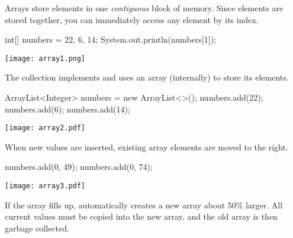 
Arrays store elements in one \emph{contiguous} block of memory.
Since elements are stored together, you can immediately access any element by its index.

\vspace{1ex}
\begin{minipage}{0.50\linewidth}
\begin{javalst}
    int[] numbers = {22, 6, 14};
    System.out.println(numbers[1]);
\end{javalst}
\end{minipage}
\hfill
\begin{minipage}{0.48\linewidth}
\centering
\texttt{[image: array1.png]}
\end{minipage}
\vspace{1ex}

The  collection implements  and uses an array (internally) to store its elements.

\vspace{1ex}
\begin{minipage}{0.35\linewidth}
\begin{javalst}
    ArrayList<Integer> numbers = new ArrayList<>();
    numbers.add(22);
    numbers.add(6);
    numbers.add(14);
\end{javalst}
\end{minipage}
\hfill
\begin{minipage}{0.63\linewidth}
\vspace*{2em}
\texttt{[image: array2.pdf]}
\end{minipage}
\vspace{1ex}

When new values are inserted, existing array elements are moved to the right.

\vspace{1ex}
\begin{minipage}{0.35\linewidth}
\begin{javalst}
    numbers.add(0, 49);
    numbers.add(0, 74);
\end{javalst}
\end{minipage}
\hfill
\begin{minipage}{0.63\linewidth}
\texttt{[image: array3.pdf]}
\end{minipage}
\vspace{1ex}

If the array fills up,  automatically creates a new array about 50\% larger.
All current values must be copied into the new array, and the old array is then garbage collected.


